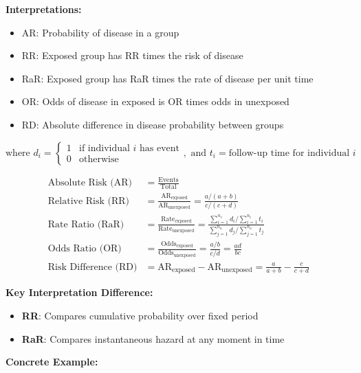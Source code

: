 \documentclass{article}
\begin{document}
\textbf{Interpretations:}
\begin{itemize}
\item AR: Probability of disease in a group
\item RR: Exposed group has RR times the risk of disease 
\item RaR: Exposed group has RaR times the rate of disease per unit time
\item OR: Odds of disease in exposed is OR times odds in unexposed
\item RD: Absolute difference in disease probability between groups
\end{itemize}

$\text{where } d_i = \begin{cases} 1 & \text{if individual } i \text{ has event} \\ 0 & \text{otherwise} \end{cases}, \text{ and } t_i = \text{follow-up time for individual } i$

\begin{align}
\text{Absolute Risk (AR)} &= \frac{\text{Events}}{\text{Total}} \\[0.5em]
\text{Relative Risk (RR)} &= \frac{\text{AR}_{\text{exposed}}}{\text{AR}_{\text{unexposed}}} = \frac{a/(a+b)}{c/(c+d)} \\[0.5em]
\text{Rate Ratio (RaR)} &= \frac{\text{Rate}_{\text{exposed}}}{\text{Rate}_{\text{unexposed}}} = \frac{\sum_{i=1}^{n_e} d_i / \sum_{i=1}^{n_e} t_i}{\sum_{j=1}^{n_u} d_j / \sum_{j=1}^{n_u} t_j} \\[0.5em]
\text{Odds Ratio (OR)} &= \frac{\text{Odds}_{\text{exposed}}}{\text{Odds}_{\text{unexposed}}} = \frac{a/b}{c/d} = \frac{ad}{bc} \\[0.5em]
\text{Risk Difference (RD)} &= \text{AR}_{\text{exposed}} - \text{AR}_{\text{unexposed}} = \frac{a}{a+b} - \frac{c}{c+d}
\end{align}

\textbf{Key Interpretation Difference:}
\begin{itemize}
\item \textbf{RR}: Compares cumulative probability over fixed period
\item \textbf{RaR}: Compares instantaneous hazard at any moment in time
\end{itemize}

\textbf{Concrete Example:}
 \\
\end{document}

